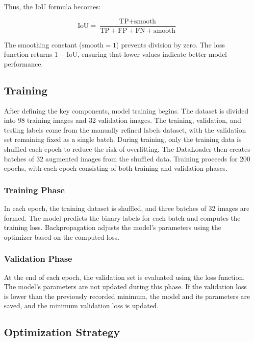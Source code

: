 Thus, the IoU formula becomes:

\begin{equation}
\text{IoU} = \frac{\text{TP} + \text{smooth}}{\text{TP} + \text{FP} + \text{FN} + \text{smooth}}
\label{eq:iou_smooth}
\end{equation}


The smoothing constant (\(\text{smooth} = 1\)) prevents division by zero. The loss function returns \( 1 - \text{IoU} \), ensuring that lower values indicate better model performance.

\subsection{Training}

After defining the key components, model training begins. The dataset is divided into 98 training images and 32 validation images. The training, validation, and testing labels come from the manually refined labels dataset, with the validation set remaining fixed as a single batch. During training, only the training data is shuffled each epoch to reduce the risk of overfitting. The DataLoader then creates batches of 32 augmented images from the shuffled data. Training proceeds for 200 epochs, with each epoch consisting of both training and validation phases.

\subsubsection{Training Phase}

In each epoch, the training dataset is shuffled, and three batches of 32 images are formed. The model predicts the binary labels for each batch and computes the training loss. Backpropagation adjusts the model's parameters using the optimizer based on the computed loss.

\subsubsection{Validation Phase}

At the end of each epoch, the validation set is evaluated using the loss function. The model's parameters are not updated during this phase. If the validation loss is lower than the previously recorded minimum, the model and its parameters are saved, and the minimum validation loss is updated.

\subsection{Optimization Strategy}

